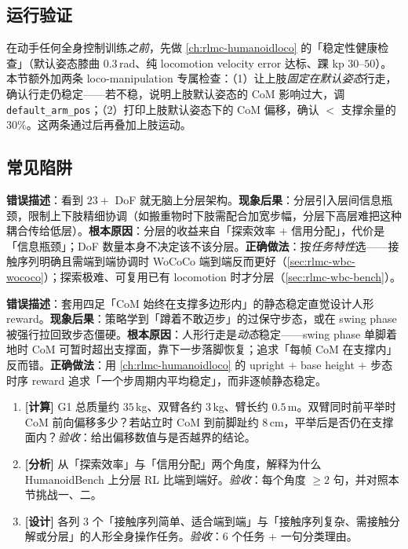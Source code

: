 \subsection{运行验证}
在动手任何全身控制训练\emph{之前}，先做 \cref{ch:rlmc-humanoidloco} 的「稳定性健康检查」（默认姿态膝曲 $0.3$\,rad、纯 locomotion velocity error 达标、踝 kp $30$--$50$）。本节额外加两条 loco-manipulation 专属检查：（1）让上肢\emph{固定在默认姿态}行走，确认行走仍稳定——若不稳，说明上肢默认姿态的 CoM 影响过大，调 \verb|default_arm_pos|；（2）打印上肢默认姿态下的 CoM 偏移，确认 $<$ 支撑余量的 $30\%$。这两条通过后再叠加上肢运动。

\subsection{常见陷阱}
\begin{pitfall}
\textbf{错误描述}：看到 $23+$ DoF 就无脑上分层架构。\textbf{现象后果}：分层引入层间信息瓶颈，限制上下肢精细协调（如搬重物时下肢需配合加宽步幅，分层下高层难把这种耦合传给低层）。\textbf{根本原因}：分层的收益来自「探索效率 $+$ 信用分配」，代价是「信息瓶颈」；DoF 数量本身不决定该不该分层。\textbf{正确做法}：按\emph{任务特性}选——接触序列明确且需端到端协调时 WoCoCo 端到端反而更好（\cref{sec:rlmc-wbc-wococo}）；探索极难、可复用已有 locomotion 时才分层（\cref{sec:rlmc-wbc-bench}）。
\end{pitfall}
\begin{pitfall}[把「人形」当「两条腿的四足」]
\textbf{错误描述}：套用四足「CoM 始终在支撑多边形内」的静态稳定直觉设计人形 reward。\textbf{现象后果}：策略学到「蹲着不敢迈步」的过保守步态，或在 swing phase 被强行拉回致步态僵硬。\textbf{根本原因}：人形行走是\emph{动态}稳定——swing phase 单脚着地时 CoM 可暂时超出支撑面，靠下一步落脚恢复；追求「每帧 CoM 在支撑内」反而错。\textbf{正确做法}：用 \cref{ch:rlmc-humanoidloco} 的 upright $+$ base height $+$ 步态时序 reward 追求「一个步周期内平均稳定」，而非逐帧静态稳定。
\end{pitfall}

\begin{practice}[本节动手]
\begin{enumerate}
  \item \textbf{[计算]} G1 总质量约 $35$\,kg、双臂各约 $3$\,kg、臂长约 $0.5$\,m。双臂同时前平举时 CoM 前向偏移多少？若站立时 CoM 到前脚趾约 $8$\,cm，平举后是否仍在支撑面内？\emph{验收}：给出偏移数值与是否越界的结论。
  \item \textbf{[分析]} 从「探索效率」与「信用分配」两个角度，解释为什么 HumanoidBench 上分层 RL 比端到端好。\emph{验收}：每个角度 $\geq 2$ 句，并对照本节挑战一、二。
  \item \textbf{[设计]} 各列 $3$ 个「接触序列简单、适合端到端」与「接触序列复杂、需接触分解或分层」的人形全身操作任务。\emph{验收}：$6$ 个任务 $+$ 一句分类理由。
\end{enumerate}
\end{practice}

